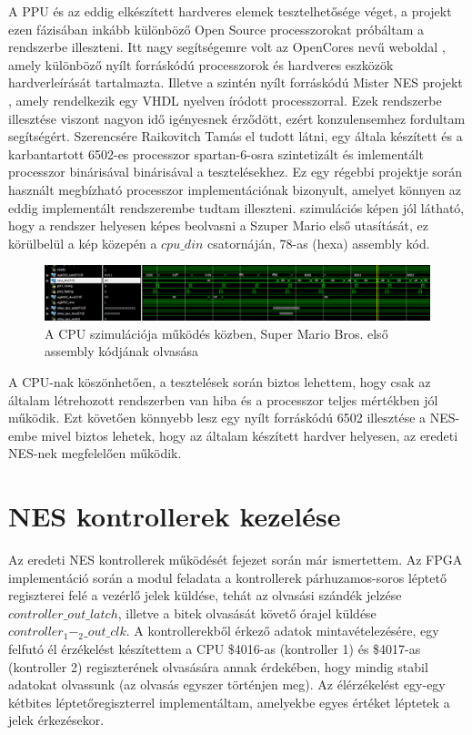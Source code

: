 A PPU és az eddig elkészített hardveres elemek tesztelhetősége véget, a projekt ezen fázisában inkább különböző Open Source processzorokat próbáltam a rendszerbe illeszteni. Itt nagy segítségemre volt az OpenCores nevű weboldal \cite{OpenCore}, amely különböző nyílt forráskódú processzorok és hardveres eszközök hardverleírását tartalmazta. Illetve a szintén nyílt forráskódú Mister NES projekt \cite{MisterNES}, amely rendelkezik egy VHDL nyelven íródott processzorral. Ezek rendszerbe illesztése viszont nagyon idő igényesnek érződött, ezért konzulensemhez fordultam segítségért. Szerencsére Raikovitch Tamás el tudott látni, egy általa készített és a karbantartott 6502-es processzor spartan-6-osra szintetizált és imlementált processzor binárisával binárisával a tesztelésekhez. Ez egy régebbi projektje során használt megbízható processzor implementációnak bizonyult, amelyet könnyen az eddig implementált rendszerembe tudtam illeszteni.  szimulációs képen jól látható, hogy a rendszer helyesen képes beolvasni a Szuper Mario első utasítását, ez körülbelül a kép közepén a $cpu\_din$ csatornáján, 78-as (hexa) assembly kód. 

\begin{figure}[H]
	\centering
	\includegraphics[width=150mm, keepaspectratio]{figures/working-cpu-simulation}
	\caption{A CPU szimulációja működés közben, Super Mario Bros. első assembly kódjának olvasása} 
	\label{fig:working-cpu-simulation}
\end{figure} 

A CPU-nak köszönhetően, a tesztelések során biztos lehettem, hogy csak az általam létrehozott rendszerben van hiba és a processzor teljes mértékben jól működik. Ezt követően könnyebb lesz egy nyílt forráskódú 6502 illesztése a NES-embe mivel biztos lehetek, hogy az általam készített hardver helyesen, az eredeti NES-nek megfelelően működik. 

\section{NES kontrollerek kezelése}

Az eredeti NES kontrollerek működését  fejezet során már ismertettem. Az FPGA implementáció során a modul feladata a kontrollerek párhuzamos-soros léptető regiszterei felé a vezérlő jelek küldése, tehát az olvasási szándék jelzése $controller\_out\_latch$, illetve a bitek olvasását követő órajel küldése $controller_1-_2\_out\_clk$. A kontrollerekből érkező adatok mintavételezésére, egy felfutó él érzékelést készítettem a CPU \$4016-as (kontroller 1) és \$4017-as (kontroller 2) regiszterének olvasására annak érdekében, hogy mindig stabil adatokat olvassunk (az olvasás egyszer történjen meg). Az élérzékelést egy-egy kétbites léptetőregiszterrel implementáltam, amelyekbe egyes értéket léptetek a jelek érkezésekor.   

